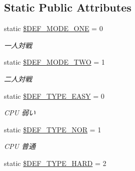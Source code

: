 \subsection*{Static Public Attributes}
\begin{DoxyCompactItemize}
\item 
static \hyperlink{class_reversi_const_a3ae565ad68b714102079e94a675e2e79}{\$\+D\+E\+F\+\_\+\+M\+O\+D\+E\+\_\+\+O\+NE} = 0\hypertarget{class_reversi_const_a3ae565ad68b714102079e94a675e2e79}{}\label{class_reversi_const_a3ae565ad68b714102079e94a675e2e79}

\begin{DoxyCompactList}\small\item\em 一人対戦 \end{DoxyCompactList}\item 
static \hyperlink{class_reversi_const_ad6b4696b7c6a13ff0b2bf9971dbfce9e}{\$\+D\+E\+F\+\_\+\+M\+O\+D\+E\+\_\+\+T\+WO} = 1\hypertarget{class_reversi_const_ad6b4696b7c6a13ff0b2bf9971dbfce9e}{}\label{class_reversi_const_ad6b4696b7c6a13ff0b2bf9971dbfce9e}

\begin{DoxyCompactList}\small\item\em 二人対戦 \end{DoxyCompactList}\item 
static \hyperlink{class_reversi_const_aa7c8b5c0a0cb3962fba2630bd31a3d27}{\$\+D\+E\+F\+\_\+\+T\+Y\+P\+E\+\_\+\+E\+A\+SY} = 0\hypertarget{class_reversi_const_aa7c8b5c0a0cb3962fba2630bd31a3d27}{}\label{class_reversi_const_aa7c8b5c0a0cb3962fba2630bd31a3d27}

\begin{DoxyCompactList}\small\item\em C\+PU 弱い \end{DoxyCompactList}\item 
static \hyperlink{class_reversi_const_aa41e16eea08a1ac1bee29417b96f56c8}{\$\+D\+E\+F\+\_\+\+T\+Y\+P\+E\+\_\+\+N\+OR} = 1\hypertarget{class_reversi_const_aa41e16eea08a1ac1bee29417b96f56c8}{}\label{class_reversi_const_aa41e16eea08a1ac1bee29417b96f56c8}

\begin{DoxyCompactList}\small\item\em C\+PU 普通 \end{DoxyCompactList}\item 
static \hyperlink{class_reversi_const_a51a0e47e9e83936aa16a4b7eebdac02f}{\$\+D\+E\+F\+\_\+\+T\+Y\+P\+E\+\_\+\+H\+A\+RD} = 2\hypertarget{class_reversi_const_a51a0e47e9e83936aa16a4b7eebdac02f}{}\label{class_reversi_const_a51a0e47e9e83936aa16a4b7eebdac02f}


\end{DoxyCompactItemize}
